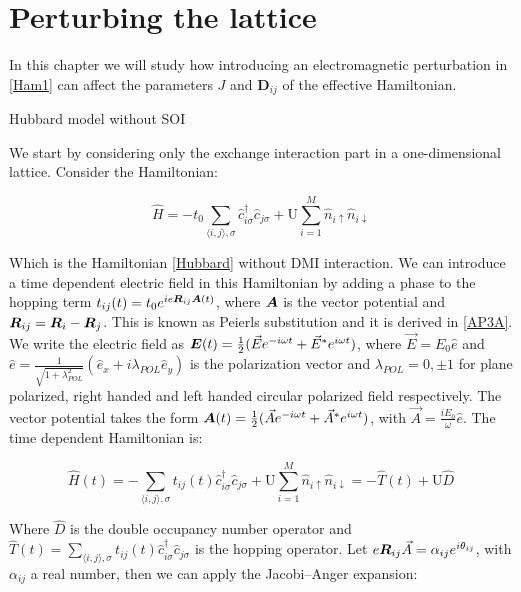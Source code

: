 \chapter{Perturbing the lattice}

In this chapter we will study how introducing an electromagnetic perturbation in \ref{Ham1} can affect the parameters $J$ and $\boldsymbol{D}_{ij}$ of the effective Hamiltonian. 

\begin{section}{Hubbard model without SOI}

We start by considering only the exchange interaction part in a one-dimensional lattice. Consider the Hamiltonian:

\begin{equation}
\hat{H} = -t_0\sum_{\langle i,j \rangle, \sigma} \hat{c}_{i \sigma}^\dagger \hat{c}_{j \sigma} + \text{U} \sum_{i=1}^M \hat{n}_{i\uparrow}\hat{n}_{i\downarrow}
\end{equation}

Which is the Hamiltonian \ref{Hubbard} without DMI interaction. We can introduce a time dependent electric field in this Hamiltonian by adding a phase to the hopping term $t_{ij}(t) = t_0e^{ie\boldsymbol{R}_{ij}\boldsymbol{A}(t)}$, where $\boldsymbol{A}$ is the vector potential and $\boldsymbol{R}_{ij} = \boldsymbol{R}_i-\boldsymbol{R}_j$. This is known as Peierls substitution and it is derived in \ref{AP3A}. We write the electric field as $\boldsymbol{E}(t) = \frac{1}{2}(\vec{E}e^{-i\omega t}+\vec{E}^*e^{i\omega t})$, where $\vec{E} = E_0\hat{e}$ and $\hat{e} = \frac{1}{\sqrt{1+\lambda_{POL}^2}}(\hat{e}_x+i\lambda_{POL}\hat{e}_y)$ is the polarization vector and $\lambda_{POL} = 0, \pm 1$ for plane polarized, right handed and left handed circular polarized field respectively. The vector potential takes the form $\boldsymbol{A}(t) = \frac{1}{2}(\vec{A}e^{-i\omega t} + \vec{A}^* e^{i\omega t})$, with $\vec{A} = \frac{iE_0}{\omega}\hat{e}$. The time dependent Hamiltonian is:

\begin{equation}
\hat{H}(t) = -\sum_{\langle i,j \rangle, \sigma} t_{ij}(t)\hat{c}_{i \sigma}^\dagger \hat{c}_{j \sigma} + \text{U} \sum_{i=1}^M \hat{n}_{i\uparrow}\hat{n}_{i\downarrow} = -\hat{T}(t) + \text{U}\hat{D}
\end{equation}

Where $\hat{D}$ is the double occupancy number operator and $\hat{T}(t) = \sum_{\langle i,j \rangle, \sigma} t_{ij}(t)\hat{c}_{i \sigma}^\dagger \hat{c}_{j \sigma}$ is the hopping operator. Let $e\boldsymbol{R}_{ij}\vec{A} = \alpha_{ij} e^{i \theta_{ij}}$, with $\alpha_{ij}$ a real number, then we can apply the Jacobi–Anger expansion:


\end{section}
